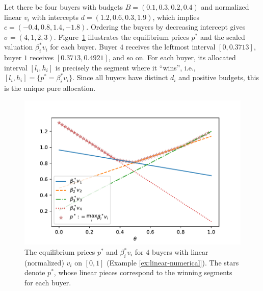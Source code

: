 \begin{example}
	[Linear $v_i$]
	\label{ex:linear-numerical}
	Let there be four buyers with budgets $B = (0.1, 0.3, 0.2, 0.4)$ and normalized linear $v_i$ with intercepts $d = (1.2, 0.6, 0.3, 1.9)$, which implies $c = (-0.4,  0.8,  1.4, -1.8)$. Ordering the buyers by decreasing intercept gives $\sigma = (4, 1, 2, 3)$. 
	Figure~\ref{fig:n-linear} illustrates the equilibrium prices $p^*$ and the scaled valuation $\beta^*_i v_i$ for each buyer. Buyer $4$ receives the leftmost interval $[0, 0.3713]$, buyer $1$ receives $[0.3713, 0.4921]$, and so on. 
	For each buyer, its allocated interval $[l_i,h_i]$ is precisely the segment where it ``wins'', i.e., $[l_i, h_i] = \{p^* = \beta^*_i v_i\}$. 
	Since all buyers have distinct $d_i$ and positive budgets, this is the unique pure allocation. 
\end{example}

\begin{figure}
	\centering
	\includegraphics[scale=0.5]{codes/n-linear.pdf}
	\caption{The equilibrium prices $p^*$ and $\beta^*_i v_i$ for $4$ buyers with linear (normalized) $v_i$ on $[0,1]$ (Example \ref{ex:linear-numerical}). 
	The stars denote $p^*$, whose linear pieces correspond to the winning segments for each buyer.
	}
	\label{fig:n-linear}
\end{figure}

